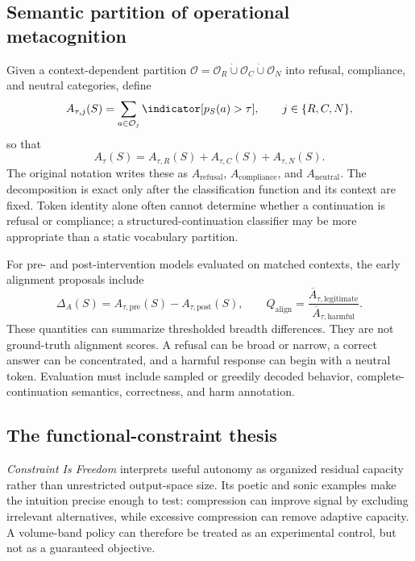 \subsection{Semantic partition of operational metacognition}
Given a context-dependent partition $\mathcal O=\mathcal O_R\dot\cup\mathcal O_C\dot\cup\mathcal O_N$ into refusal, compliance, and neutral categories, define
\begin{equation}
A_{\tau,j}(S)=\sum_{a\in\mathcal O_j}\indicator[p_S(a)>\tau],
\qquad j\in\{R,C,N\},
\end{equation}
so that
\begin{equation}
A_\tau(S)=A_{\tau,R}(S)+A_{\tau,C}(S)+A_{\tau,N}(S).
\label{eq:semantic-decomposition}
\end{equation}
The original notation writes these as $A_{\mathrm{refusal}}$, $A_{\mathrm{compliance}}$, and $A_{\mathrm{neutral}}$. The decomposition is exact only after the classification function and its context are fixed. Token identity alone often cannot determine whether a continuation is refusal or compliance; a structured-continuation classifier may be more appropriate than a static vocabulary partition.

For pre- and post-intervention models evaluated on matched contexts, the early alignment proposals include
\begin{equation}
\Delta_A(S)=A_{\tau,\mathrm{pre}}(S)-A_{\tau,\mathrm{post}}(S),
\qquad
Q_{\mathrm{align}}=\frac{\overline A_{\tau,\mathrm{legitimate}}}
{\overline A_{\tau,\mathrm{harmful}}}.
\label{eq:alignment-proposals}
\end{equation}
These quantities can summarize thresholded breadth differences. They are not ground-truth alignment scores. A refusal can be broad or narrow, a correct answer can be concentrated, and a harmful response can begin with a neutral token. Evaluation must include sampled or greedily decoded behavior, complete-continuation semantics, correctness, and harm annotation.

\subsection{The functional-constraint thesis}
\emph{Constraint Is Freedom} interprets useful autonomy as organized residual capacity rather than unrestricted output-space size. Its poetic and sonic examples make the intuition precise enough to test: compression can improve signal by excluding irrelevant alternatives, while excessive compression can remove adaptive capacity. A volume-band policy can therefore be treated as an experimental control, but not as a guaranteed objective.

